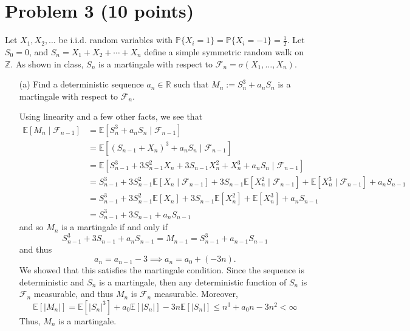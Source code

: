 \documentclass[11pt]{article}
\newcommand{\bbE}{\mathbb{E}}
\begin{document}
\newpage

\section*{Problem 3 (10 points)}
Let \(X_1, X_2, \ldots\) be i.i.d. random variables with \(\mathbb{P}\{X_i = 1\} = \mathbb{P}\{X_i = -1\} = \frac{1}{2}\). Let \(S_0 = 0\), and \(S_n = X_1 + X_2 + \cdots + X_n\) define a simple symmetric random walk on \(\mathbb{Z}\). As shown in class, \(S_n\) is a martingale with respect to \(\mathcal{F}_n = \sigma(X_1, \ldots, X_n)\).

\begin{itemize}
    \item[(a)] Find a deterministic sequence \(a_n \in \mathbb{R}\) such that \(M_n := S_n^3 + a_n S_n\) is a martingale with respect to \(\mathcal{F}_n\).
    \begin{solution}

Using linearity and a few other facts, we see that
\begin{align*}
    \bbE[M_n \mid \mathcal{F}_{n-1}] &= \bbE[S_{n}^3 + a_n S_n \mid \mathcal{F}_{n-1}]\\
    &= \bbE[(S_{n-1} + X_n)^3 + a_nS_{n} \mid \mathcal{F}_{n-1}]\\
    &= \bbE[S_{n-1}^3 + 3S_{n-1}^2 X_n + 3S_{n-1}X_n^2+X_n^3 + a_n S_{n} \mid \mathcal{F}_{n-1}]\\
    &= S^3_{n-1} + 3S^2_{n-1}\bbE[X_n \mid \mathcal{F}_{n-1}] + 3S_{n-1}\bbE[X_n^2 \mid \mathcal{F}_{n-1}] + \bbE[X_n^3 \mid \mathcal{F}_{n-1}] + a_n S_{n-1}\\
    &= S^3_{n-1} + 3S^2_{n-1}\bbE[X_n] + 3S_{n-1}\bbE[X_n^2 ] + \bbE[X_n^3 ] + a_n S_{n-1}\\
    &= S^3_{n-1} + 3S_{n-1} + a_nS_{n-1}
\end{align*}
and so $M_n$ is a martingale if and only if
\[S^3_{n-1} + 3S_{n-1} + a_nS_{n-1} = M_{n-1} = S_{n-1}^3 + a_{n-1}S_{n-1}\] and thus 
\[a_n = a_{n-1} - 3 \implies \boxed{a_n =  a_0+ (- 3n)}.\] We showed that this satisfies the martingale condition. Since the sequence is deterministic and $S_n$ is a martingale, then any deterministic function of $S_n$ is $\mathcal{F}_n$ measurable, and thus $M_n$ is $\mathcal{F}_n$ measurable. Moreover,
\[\bbE[|M_n|] = \bbE[|S_n|^3] + a_0\bbE[|S_n|] - 3n\bbE[|S_n|] \leq n^3 + a_0n - 3n^2< \infty\] Thus, $M_n$ is a martingale.



\end{solution}
\end{itemize}
\end{document}
